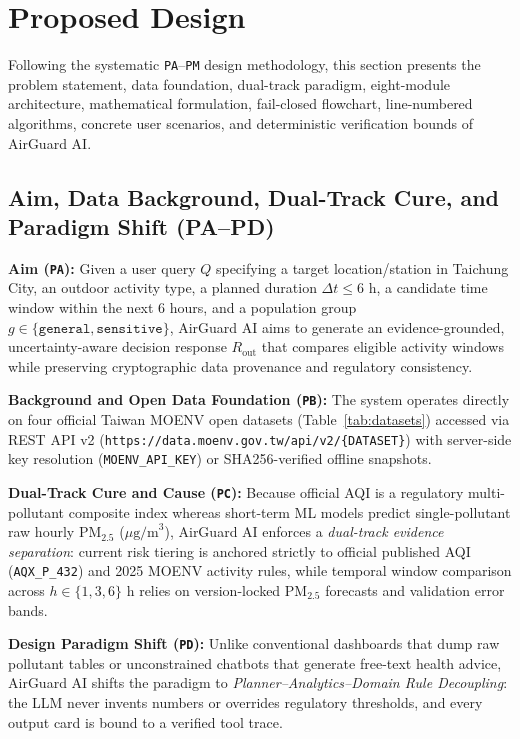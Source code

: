 \section{Proposed Design}

Following the systematic \texttt{PA}--\texttt{PM} design methodology, this section presents the problem statement, data foundation, dual-track paradigm, eight-module architecture, mathematical formulation, fail-closed flowchart, line-numbered algorithms, concrete user scenarios, and deterministic verification bounds of AirGuard AI.

\subsection{Aim, Data Background, Dual-Track Cure, and Paradigm Shift (PA--PD)}
\textbf{Aim (\texttt{PA}):} Given a user query $Q$ specifying a target location/station in Taichung City, an outdoor activity type, a planned duration $\Delta t \le 6\text{ h}$, a candidate time window within the next 6 hours, and a population group $g \in \{\texttt{general}, \texttt{sensitive}\}$, AirGuard AI aims to generate an evidence-grounded, uncertainty-aware decision response $R_{\text{out}}$ that compares eligible activity windows while preserving cryptographic data provenance and regulatory consistency.

\textbf{Background and Open Data Foundation (\texttt{PB}):} The system operates directly on four official Taiwan MOENV open datasets (Table~\ref{tab:datasets}) accessed via REST API v2 (\texttt{https://data.moenv.gov.tw/api/v2/\{DATASET\}}) with server-side key resolution (\texttt{MOENV\_API\_KEY}) or SHA256-verified offline snapshots.

\textbf{Dual-Track Cure and Cause (\texttt{PC}):} Because official AQI is a regulatory multi-pollutant composite index whereas short-term ML models predict single-pollutant raw hourly $\text{PM}_{2.5}$ ($\mu\text{g/m}^3$), AirGuard AI enforces a \emph{dual-track evidence separation}: current risk tiering is anchored strictly to official published AQI (\texttt{AQX\_P\_432}) and 2025 MOENV activity rules, while temporal window comparison across $h \in \{1, 3, 6\}\text{ h}$ relies on version-locked $\text{PM}_{2.5}$ forecasts and validation error bands.

\textbf{Design Paradigm Shift (\texttt{PD}):} Unlike conventional dashboards that dump raw pollutant tables or unconstrained chatbots that generate free-text health advice, AirGuard AI shifts the paradigm to \emph{Planner--Analytics--Domain Rule Decoupling}: the LLM never invents numbers or overrides regulatory thresholds, and every output card is bound to a verified tool trace.

